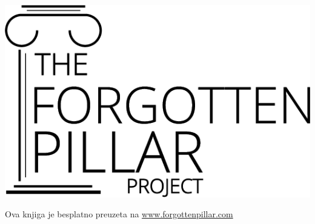 {%
\noindent
\begin{minipage}{0.3\textwidth}
    \includegraphics[width=\linewidth]{images/logo-black.png}
\end{minipage}%
\hfill
\begin{minipage}{\dimexpr\linewidth-0.3\textwidth-0.2\textwidth-1em\relax}
    \raggedleft\footnotesize
    Ova knjiga je besplatno preuzeta na \href{https://forgottenpillar.com/book/the-forgotten-pillar}{www.forgottenpillar.com}
\end{minipage}%
\hfill
\begin{minipage}{0.125\textwidth}
    \centering
\end{minipage}
}